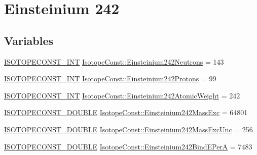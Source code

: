 \hypertarget{group___isotope_const-_einsteinium-_es242}{}\section{Einsteinium 242}
\label{group___isotope_const-_einsteinium-_es242}
\subsection*{Variables}
\begin{DoxyCompactItemize}
\item 
\mbox{\hyperlink{group___isotope_const-_macros_ga5f18360b3e99483a35c32d789e62621c}{I\+S\+O\+T\+O\+P\+E\+C\+O\+N\+S\+T\+\_\+\+I\+NT}} \mbox{\hyperlink{group___isotope_const-_einsteinium-_es242_ga6ff66dd17c04a742ef5f61203dbf0477}{Isotope\+Const\+::\+Einsteinium242\+Neutrons}} = 143
\item 
\mbox{\hyperlink{group___isotope_const-_macros_ga5f18360b3e99483a35c32d789e62621c}{I\+S\+O\+T\+O\+P\+E\+C\+O\+N\+S\+T\+\_\+\+I\+NT}} \mbox{\hyperlink{group___isotope_const-_einsteinium-_es242_ga6081d61888d538ff60ceac0518a5804c}{Isotope\+Const\+::\+Einsteinium242\+Protons}} = 99
\item 
\mbox{\hyperlink{group___isotope_const-_macros_ga5f18360b3e99483a35c32d789e62621c}{I\+S\+O\+T\+O\+P\+E\+C\+O\+N\+S\+T\+\_\+\+I\+NT}} \mbox{\hyperlink{group___isotope_const-_einsteinium-_es242_gaccca6273134468814b976878c7b56a44}{Isotope\+Const\+::\+Einsteinium242\+Atomic\+Weight}} = 242
\item 
\mbox{\hyperlink{group___isotope_const-_macros_ga8f45a7272ce02c0b4c65c44636ed719a}{I\+S\+O\+T\+O\+P\+E\+C\+O\+N\+S\+T\+\_\+\+D\+O\+U\+B\+LE}} \mbox{\hyperlink{group___isotope_const-_einsteinium-_es242_ga441d42ac57d52132384f527e079fa85f}{Isotope\+Const\+::\+Einsteinium242\+Mass\+Exc}} = 64801
\item 
\mbox{\hyperlink{group___isotope_const-_macros_ga8f45a7272ce02c0b4c65c44636ed719a}{I\+S\+O\+T\+O\+P\+E\+C\+O\+N\+S\+T\+\_\+\+D\+O\+U\+B\+LE}} \mbox{\hyperlink{group___isotope_const-_einsteinium-_es242_ga40de71e84e6bd7e1aebe13b4f4b0b7ca}{Isotope\+Const\+::\+Einsteinium242\+Mass\+Exc\+Unc}} = 256
\item 
\mbox{\hyperlink{group___isotope_const-_macros_ga8f45a7272ce02c0b4c65c44636ed719a}{I\+S\+O\+T\+O\+P\+E\+C\+O\+N\+S\+T\+\_\+\+D\+O\+U\+B\+LE}} \mbox{\hyperlink{group___isotope_const-_einsteinium-_es242_ga9fdf34c9b4aed9333bddad64c33621fa}{Isotope\+Const\+::\+Einsteinium242\+Bind\+E\+PerA}} = 7483
\item 

\end{DoxyCompactItemize}
